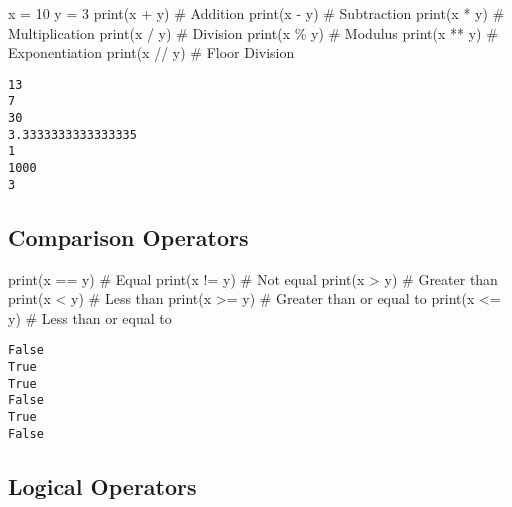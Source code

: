 \documentclass[
  letterpaper,
  DIV=11,
  numbers=noendperiod]{scrreprt}
\newenvironment{Shaded}{\begin{snugshade}}{\end{snugshade}}
\newcommand{\BuiltInTok}[1]{\textcolor[rgb]{0.00,0.23,0.31}{#1}}
\newcommand{\CommentTok}[1]{\textcolor[rgb]{0.37,0.37,0.37}{#1}}
\newcommand{\DecValTok}[1]{\textcolor[rgb]{0.68,0.00,0.00}{#1}}
\newcommand{\NormalTok}[1]{\textcolor[rgb]{0.00,0.23,0.31}{#1}}
\newcommand{\OperatorTok}[1]{\textcolor[rgb]{0.37,0.37,0.37}{#1}}
\begin{document}
\begin{Shaded}
\begin{Highlighting}[]
\NormalTok{x }\OperatorTok{=} \DecValTok{10}
\NormalTok{y }\OperatorTok{=} \DecValTok{3}
\BuiltInTok{print}\NormalTok{(x }\OperatorTok{+}\NormalTok{ y)  }\CommentTok{\# Addition}
\BuiltInTok{print}\NormalTok{(x }\OperatorTok{{-}}\NormalTok{ y)  }\CommentTok{\# Subtraction}
\BuiltInTok{print}\NormalTok{(x }\OperatorTok{*}\NormalTok{ y)  }\CommentTok{\# Multiplication}
\BuiltInTok{print}\NormalTok{(x }\OperatorTok{/}\NormalTok{ y)  }\CommentTok{\# Division}
\BuiltInTok{print}\NormalTok{(x }\OperatorTok{\%}\NormalTok{ y)  }\CommentTok{\# Modulus}
\BuiltInTok{print}\NormalTok{(x }\OperatorTok{**}\NormalTok{ y) }\CommentTok{\# Exponentiation}
\BuiltInTok{print}\NormalTok{(x }\OperatorTok{//}\NormalTok{ y) }\CommentTok{\# Floor Division}
\end{Highlighting}
\end{Shaded}

\begin{verbatim}
13
7
30
3.3333333333333335
1
1000
3
\end{verbatim}

\subsection{Comparison Operators}\label{comparison-operators}

\begin{Shaded}
\begin{Highlighting}[]
\BuiltInTok{print}\NormalTok{(x }\OperatorTok{==}\NormalTok{ y)  }\CommentTok{\# Equal}
\BuiltInTok{print}\NormalTok{(x }\OperatorTok{!=}\NormalTok{ y)  }\CommentTok{\# Not equal}
\BuiltInTok{print}\NormalTok{(x }\OperatorTok{\textgreater{}}\NormalTok{ y)   }\CommentTok{\# Greater than}
\BuiltInTok{print}\NormalTok{(x }\OperatorTok{\textless{}}\NormalTok{ y)   }\CommentTok{\# Less than}
\BuiltInTok{print}\NormalTok{(x }\OperatorTok{\textgreater{}=}\NormalTok{ y)  }\CommentTok{\# Greater than or equal to}
\BuiltInTok{print}\NormalTok{(x }\OperatorTok{\textless{}=}\NormalTok{ y)  }\CommentTok{\# Less than or equal to}
\end{Highlighting}
\end{Shaded}

\begin{verbatim}
False
True
True
False
True
False
\end{verbatim}

\subsection{Logical Operators}\label{logical-operators}
\end{document}
